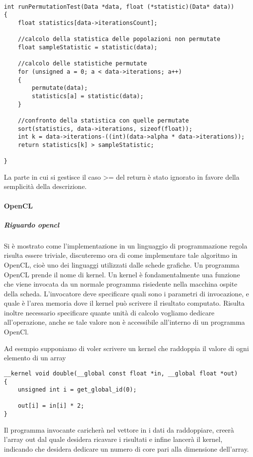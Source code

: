 \begin{lstlisting}[style=CStyle]

int runPermutationTest(Data *data, float (*statistic)(Data* data))
{
	float statistics[data->iterationsCount];
	
	//calcolo della statistica delle popolazioni non permutate
	float sampleStatistic = statistic(data); 	
	
	//calcolo delle statistiche permutate
	for (unsigned a = 0; a < data->iterations; a++)
	{
		permutate(data);
		statistics[a] = statistic(data);
	}
	
	//confronto della statistica con quelle permutate
	sort(statistics, data->iterations, sizeof(float));
	int k = data->iterations-((int)(data->alpha * data->iterations));	
	return statistics[k] > sampleStatistic;
	
}
\end{lstlisting}

La parte in cui si gestisce il caso >= del return è stato ignorato in favore della semplicità della descrizione.


\paragraph{OpenCL}
\subparagraph{Riguardo opencl}
Si è mostrato come l'implementazione in un linguaggio di programmazione regola risulta essere triviale, discuteremo ora di come implementare tale algoritmo in OpenCL, cioè uno dei linguaggi utilizzati dalle schede grafiche. Un programma OpenCL prende il nome di kernel. Un kernel è fondamentalmente una funzione che viene invocata da un normale programma risiedente nella macchina ospite della scheda. L'invocatore deve specificare quali sono i parametri di invocazione, e quale è l'area memoria dove il kernel può scrivere il risultato computato. 
Risulta inoltre necessario specificare quante unità di calcolo vogliamo dedicare all'operazione, anche se tale valore non è accessibile all'interno di un programma OpenCl.

Ad esempio supponiamo di voler scrivere un kernel che raddoppia il valore di ogni elemento di un array


\begin{lstlisting}[style=CStyle]
__kernel void double(__global const float *in, __global float *out)
{
	unsigned int i = get_global_id(0);
	
	out[i] = in[i] * 2;
}
\end{lstlisting}

Il programma invocante caricherà nel vettore in i dati da raddoppiare, creerà l'array out dal quale desidera ricavare i risultati e infine lancerà il kernel, indicando che desidera dedicare un numero di core pari alla dimensione dell'array.

